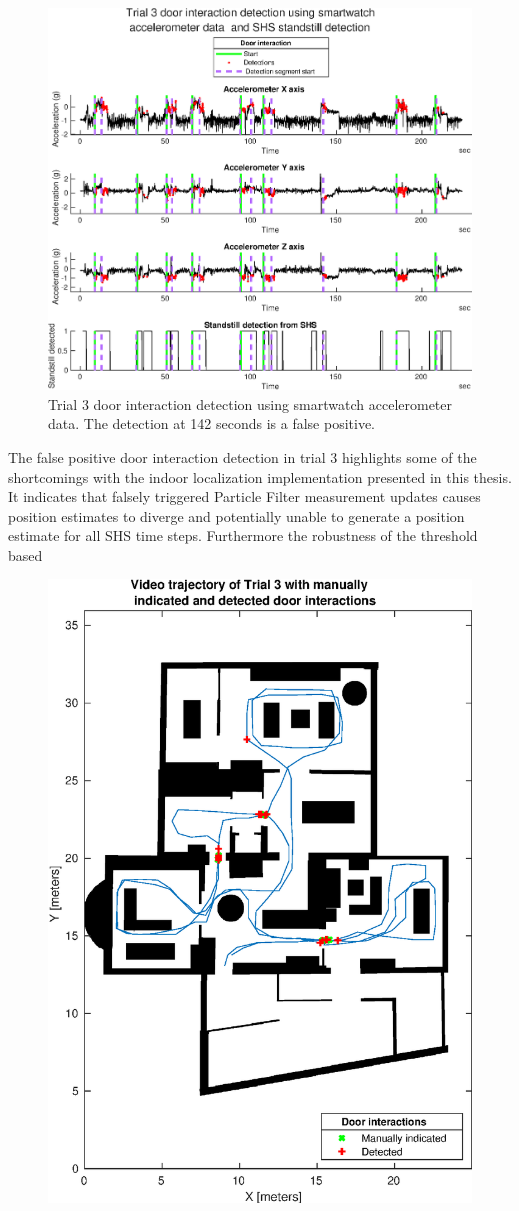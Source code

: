 \begin{figure}[H]
	\centering
	\includegraphics[width=0.9\linewidth]{images/20201201_1505_Trial_3_door_interaction_detection_using_smartwatch_1}
	\setlength{\belowcaptionskip}{-20pt}
	\caption{Trial 3 door interaction detection using smartwatch accelerometer data. The detection at 142 seconds is a false positive.}
	\label{fig:trial_3_door_interaction_detection_using_smartwatch1}
\end{figure}

The false positive door interaction detection in trial 3 highlights some of the shortcomings with the indoor localization implementation presented in this thesis. It indicates that falsely triggered Particle Filter measurement updates causes position estimates to diverge and potentially unable to generate a position estimate for all SHS time steps. Furthermore the robustness of the threshold based 

\begin{figure}[H]
	\centering
	\includegraphics[width=0.7\linewidth]{images/20201129_2330_video_traj_Trial_3_door_detect_vs_manual_1}
	\setlength{\belowcaptionskip}{-10pt}
	\caption{}
	\label{fig:video_traj_trial3_door_detect_vs_manual_1}
\end{figure}
 
 
 
 